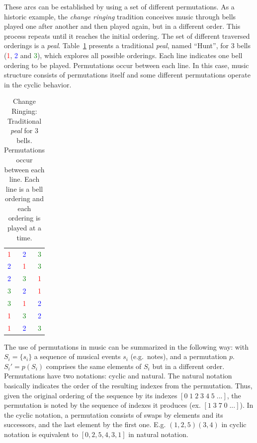 These arcs can be established by using a set of different permutations. As a historic
example, the \emph{change ringing} tradition conceives music through
bells played one after another and then played again, but in a different
order. This process repeats until it reaches the initial ordering. The set of
different traversed orderings is a \emph{peal}. Table~\ref{tab:change}
presents a traditional \emph{peal}, named ``Hunt'', for 3 bells (\textcolor{red}{1}, \textcolor{blue}{2} and \textcolor{green}{3}), which explores
all possible orderings. Each line indicates one bell ordering to be
played. Permutations occur between each line. In this case, music structure
consists of permutations itself and some different permutations operate in the
cyclic behavior.

\begin{table}[htp!]
\centering
\caption{Change Ringing: Traditional \emph{peal} for 3 bells. Permutations
occur between each line. Each line is a bell ordering and each ordering is played at a time.} 
\begin{tabular}{l c r}
\textcolor{red}{1} & \textcolor{blue}{2} & \textcolor{green}{3} \\
\textcolor{blue}{2} & \textcolor{red}{1} & \textcolor{green}{3} \\
\textcolor{blue}{2} & \textcolor{green}{3} & \textcolor{red}{1} \\
\textcolor{green}{3} & \textcolor{blue}{2} & \textcolor{red}{1} \\
\textcolor{green}{3} & \textcolor{red}{1} & \textcolor{blue}{2} \\
\textcolor{red}{1} & \textcolor{green}{3} & \textcolor{blue}{2} \\
\textcolor{red}{1} & \textcolor{blue}{2} & \textcolor{green}{3}
\end{tabular}
\label{tab:change}
\end{table}

The use of permutations in music can be summarized in the following way:
with $S_i=\{s_i\}$ a sequence of musical events $s_i$ (e.g.\ notes), and a
permutation $p$. $S_i'=p(S_i)$ comprises the same elements of $S_i$ but in a
different order. Permutations have two notations: cyclic and
natural. The natural notation basically indicates the order of the resulting indexes from
the permutation. Thus, given the original ordering of the sequence by its indexes $[0\;1\;2\;3\;4\;5\;...]$, the permutation is noted by the sequence of indexes it
produces (ex. $[1\;3\;7\;0\;...]$). In the cyclic notation, a permutation consists
of swaps by elements and its successors, and the last element by the first one.
E.g. $(1,2,5)(3,4)$ in cyclic notation is equivalent to $[0,2,5,4,3,1]$ in natural notation.

